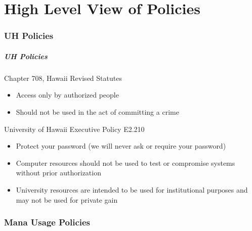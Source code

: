 \part{High Level View of Policies}
\begin{frame}
			 \partpage
\end{frame}



\section[UH Policies]{UH Policies}
\begin{frame}
  \frametitle{UH Policies}
	\begin{block}{Chapter 708, Hawaii Revised Statutes}
	\begin{itemize}
	\item Access only by authorized people
	\item Should not be used in the act of committing a crime
	\end{itemize}
	\end{block}
	\begin{block}{University of Hawaii Executive Policy E2.210} 
	\begin{itemize}
	\item Protect your password (we will never ask or require your password)
	\item Computer resources should not be used to test or compromise systems without prior authorization
	\item University resources are intended to be used for institutional purposes and may not be used for private gain
	\end{itemize}
	\end{block}
\end{frame}

\section[Mana Usage Policies]{Mana Usage Policies}

